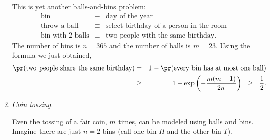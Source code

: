 \begin{enumerate}
This is yet another balls-and-bins problem:
\begin{eqnarray*}
\mbox{bin} & \equiv & \mbox{day of the year} \\
\mbox{throw a ball} & \equiv & \mbox{select birthday of a person in the room} \\
\mbox{bin with $2$ balls} & \equiv & \mbox{two people with the same birthday} .
\end{eqnarray*}
The number of bins is $n = 365$ and the number of balls is $m=23$. Using the formula we just obtained,
\begin{eqnarray*}
\pr(\mbox{two people share the same birthday})
& = & 
1 - \pr(\mbox{every bin has at most one ball}) \\
& \geq & 
1 - \exp \left(-\frac{m(m-1)}{2n} \right)
\ \ \geq \ \ 
\frac{1}{2} .
\end{eqnarray*}

\item {\it Coin tossing.}

Even the tossing of a fair coin, $m$ times, can be modeled using balls and bins. Imagine there are just $n=2$ bins (call one bin $H$ and the other bin $T$).
\end{enumerate}
